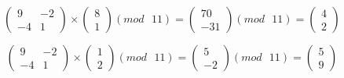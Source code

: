 \documentclass[a5paper, 10pt]{article}
\theoremstyle{definition}
\theoremstyle{plain}
\theoremstyle{remark}
\begin{document}
\begin{equation}
\begin{pmatrix}
 9 & -2\\
 -4 &  1
\end{pmatrix}
 \times
\begin{pmatrix}
 8\\
1
\end{pmatrix}
(mod \text{ }11)
= 
\begin{pmatrix}
 70\\
-31
\end{pmatrix}
(mod \text{ }11)
= \begin{pmatrix}
4\\
2
\end{pmatrix}
\end{equation}


\begin{equation}
\begin{pmatrix}
 9 & -2\\
 -4 &  1
\end{pmatrix}
 \times
\begin{pmatrix}
 1\\
2
\end{pmatrix}
(mod \text{ }11)
= 
\begin{pmatrix}
 5\\
-2
\end{pmatrix}
(mod \text{ }11)
= \begin{pmatrix}
5\\
9
\end{pmatrix}
\end{equation}
\end{document}
